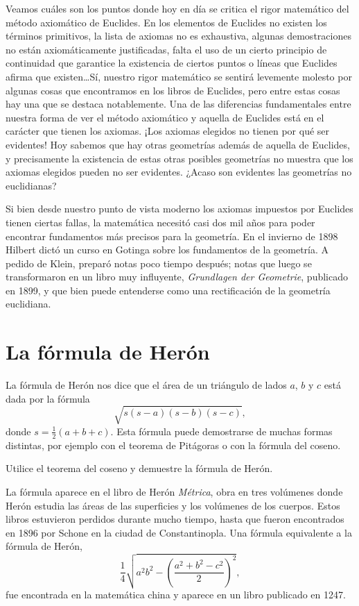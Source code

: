 Veamos cuáles son los puntos donde hoy en día se critica el rigor matemático
del método axiomático de Euclides.  En los elementos de Euclides no existen los
términos primitivos, la lista de axiomas no es exhaustiva, algunas
demostraciones no están axiomáticamente justificadas, falta el uso de un cierto
principio de continuidad que garantice la existencia de ciertos puntos o líneas
que Euclides afirma que existen\dots Sí, nuestro rigor matemático se sentirá
levemente molesto por algunas cosas que encontramos en los libros de Euclides,
pero entre estas cosas hay una que se destaca notablemente. Una de las
diferencias fundamentales entre nuestra forma de ver el método axiomático y
aquella de Euclides está en el carácter que tienen los axiomas. ¡Los axiomas
elegidos no tienen por qué ser evidentes!  Hoy sabemos que hay otras geometrías
además de aquella de Euclides, y precisamente la existencia de estas otras
posibles geometrías no muestra que los axiomas elegidos pueden no ser
evidentes. ¿Acaso son evidentes las geometrías no euclidianas?

Si bien desde nuestro punto de vista moderno los axiomas impuestos por Euclides
tienen ciertas fallas, la matemática necesitó casi dos mil años para poder
encontrar fundamentos más precisos para la geometría. En el invierno de 1898
Hilbert dictó un curso en Gotinga sobre los fundamentos de la geometría. A
pedido de Klein, preparó notas poco tiempo después; notas que luego se
transformaron en un libro muy influyente, \emph{Grundlagen der Geometrie},
publicado en 1899, y que bien puede entenderse como una rectificación de la
geometría euclidiana. 

\section*{La fórmula de Herón}

La fórmula de Herón nos dice que el área de un triángulo de lados $a$, $b$ y
$c$ está dada por la fórmula
\[
	\sqrt{s(s-a)(s-b)(s-c)},
\]
donde $s=\frac12(a+b+c)$. Esta fórmula puede demostrarse de muchas formas
distintas, por ejemplo con el teorema de Pitágoras o con la fórmula del coseno.

\begin{exercise}
	Utilice el teorema del coseno y demuestre la fórmula de Herón.
\end{exercise}

La fórmula aparece en el libro de Herón \emph{Métrica}, obra en tres volúmenes
donde Herón estudia las áreas de las superficies y los volúmenes de los
cuerpos. Estos libros estuvieron perdidos durante mucho tiempo,
hasta que fueron encontrados en 1896 por Schone en la ciudad de Constantinopla.
Una fórmula equivalente a la fórmula de Herón,
\[
	\frac14\sqrt{a^2b^2-\left(\frac{a^2+b^2-c^2}{2}\right)^2},
\]
fue encontrada en la matemática china y aparece en un libro publicado en 1247.

